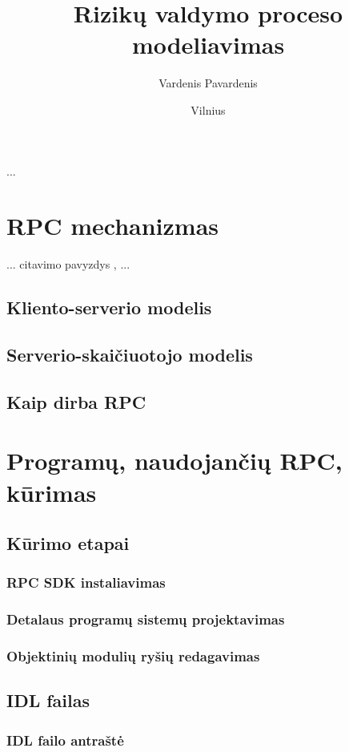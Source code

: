 \documentclass[12pt, a4paper, lithuanian]{article}
\title{Rizikų valdymo proceso modeliavimas}
\author{Vardenis Pavardenis}
\date{Vilnius\\ \the\year}
\begin{document}
\maketitle

\tableofcontents

...

\section{RPC mechanizmas}
... citavimo pavyzdys \cite{Banerjee1997}, \cite{EgArticle} ...

\subsection{Kliento-serverio modelis}
\subsection{Serverio-skaičiuotojo modelis}
\subsection{Kaip dirba RPC}

\section{Programų, naudojančių RPC, kūrimas}
\subsection{Kūrimo etapai}
\subsubsection{RPC SDK instaliavimas}
\subsubsection{Detalaus programų sistemų projektavimas}
\subsubsection{Objektinių modulių ryšių redagavimas}
\subsection{IDL failas}
\subsubsection{IDL failo antraštė}
\end{document}
